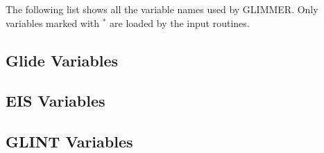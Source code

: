 \label{ug.sec.varlist}
The following list shows all the variable names used by GLIMMER. Only variables marked with $^\ast$ are loaded by the input routines.
\subsection{Glide Variables}

\subsection{EIS Variables}

\subsection{GLINT Variables}
